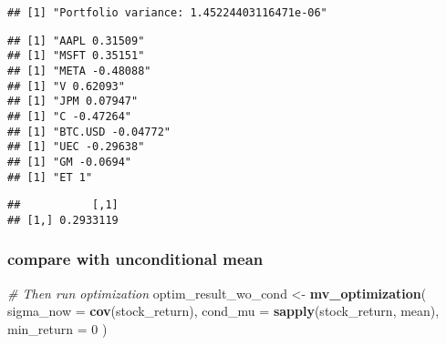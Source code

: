 \documentclass[
]{article}
\newenvironment{Shaded}{\begin{snugshade}}{\end{snugshade}}
\newcommand{\AttributeTok}[1]{\textcolor[rgb]{0.13,0.29,0.53}{#1}}
\newcommand{\CommentTok}[1]{\textcolor[rgb]{0.56,0.35,0.01}{\textit{#1}}}
\newcommand{\ControlFlowTok}[1]{\textcolor[rgb]{0.13,0.29,0.53}{\textbf{#1}}}
\newcommand{\DecValTok}[1]{\textcolor[rgb]{0.00,0.00,0.81}{#1}}
\newcommand{\FunctionTok}[1]{\textcolor[rgb]{0.13,0.29,0.53}{\textbf{#1}}}
\newcommand{\NormalTok}[1]{#1}
\newcommand{\OtherTok}[1]{\textcolor[rgb]{0.56,0.35,0.01}{#1}}
\newcommand{\SpecialCharTok}[1]{\textcolor[rgb]{0.81,0.36,0.00}{\textbf{#1}}}
\newcommand{\StringTok}[1]{\textcolor[rgb]{0.31,0.60,0.02}{#1}}
\begin{document}
\begin{verbatim}
## [1] "Portfolio variance: 1.45224403116471e-06"
\end{verbatim}

\begin{Shaded}
\end{Shaded}

\begin{verbatim}
## [1] "AAPL 0.31509"
## [1] "MSFT 0.35151"
## [1] "META -0.48088"
## [1] "V 0.62093"
## [1] "JPM 0.07947"
## [1] "C -0.47264"
## [1] "BTC.USD -0.04772"
## [1] "UEC -0.29638"
## [1] "GM -0.0694"
## [1] "ET 1"
\end{verbatim}

\begin{Shaded}
\end{Shaded}

\begin{verbatim}
##           [,1]
## [1,] 0.2933119
\end{verbatim}

\subsubsection{compare with unconditional
mean}\label{compare-with-unconditional-mean}

\begin{Shaded}
\begin{Highlighting}[]
\CommentTok{\# Then run optimization}
\NormalTok{optim\_result\_wo\_cond }\OtherTok{\textless{}{-}} \FunctionTok{mv\_optimization}\NormalTok{(}
  \AttributeTok{sigma\_now =} \FunctionTok{cov}\NormalTok{(stock\_return),}
  \AttributeTok{cond\_mu =} \FunctionTok{sapply}\NormalTok{(stock\_return, mean),}
  \AttributeTok{min\_return =} \DecValTok{0}
\NormalTok{)}
\end{Highlighting}
\end{Shaded}
\end{document}
